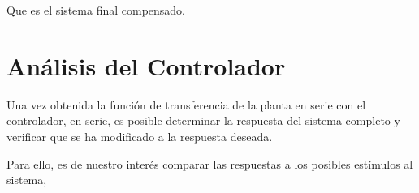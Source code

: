\documentclass[12pt,a4paper]{article}
\begin{document}
      Que es el sistema final compensado. 

  \pagebreak

  \section{Análisis del Controlador}

    Una vez obtenida la función de transferencia de la planta en serie con el controlador, en serie, es posible determinar 
    la respuesta del sistema completo y verificar que se ha modificado a la respuesta deseada. 

    Para ello, es de nuestro interés comparar las respuestas a los posibles estímulos al sistema, 

    
\end{document}
